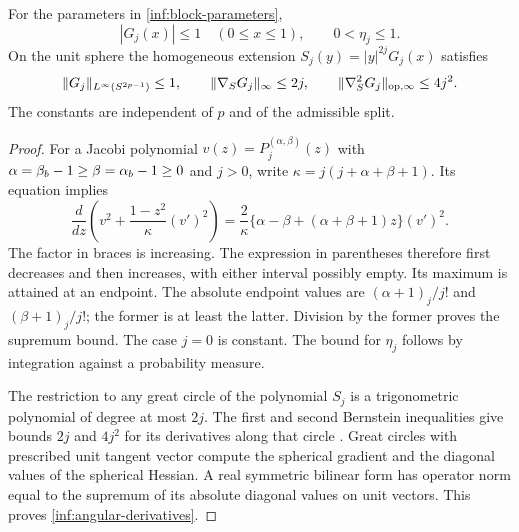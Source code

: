 \begin{lemma}\label{inf:angular-sup}
For the parameters in \eqref{inf:block-parameters},
\[
 |G_j(x)|\le1\quad(0\le x\le1),\qquad 0<\eta_j\le1.
\]
On the unit sphere the homogeneous extension
$S_j(y)=|y|^{2j}G_j(x)$ satisfies
\begin{equation}\label{inf:angular-derivatives}
 \lVert G_j\rVert_{L^\infty(S^{2p-1})}\le1,\qquad
 \lVert \nabla_S G_j\rVert_\infty\le2j,\qquad
 \lVert \nabla_S^2G_j\rVert_{\mathrm{op},\infty}\le4j^2.
\end{equation}
The constants are independent of $p$ and of the admissible split.
\end{lemma}
\begin{proof}
For a Jacobi polynomial $v(z)=P_j^{(\alpha,\beta)}(z)$ with
$\alpha=\beta_b-1\ge\beta=\alpha_b-1\ge0$ and $j>0$, write
$\kappa=j(j+\alpha+\beta+1)$. Its equation implies
\[
 \frac d{dz}\left(v^2+\frac{1-z^2}{\kappa}(v')^2\right)
 =\frac2\kappa\{\alpha-\beta+(\alpha+\beta+1)z\}(v')^2.
\]
The factor in braces is increasing. The expression in parentheses
therefore first decreases and then increases, with either interval
possibly empty. Its maximum is attained at an endpoint. The absolute
endpoint values are $(\alpha+1)_j/j!$ and $(\beta+1)_j/j!$; the former
is at least the latter. Division by the former proves the supremum
bound. The case $j=0$ is constant. The bound for $\eta_j$ follows by
integration against a probability measure.

The restriction to any great circle of the polynomial $S_j$ is a
trigonometric polynomial of degree at most $2j$. The first and second
Bernstein inequalities give bounds $2j$ and $4j^2$ for its derivatives
along that circle \cite[Vol.~II, Ch.~X, Theorem~3.13]{inf:zygmund}.
Great circles with prescribed unit tangent vector
compute the spherical gradient and the diagonal values of the
spherical Hessian. A real symmetric bilinear form has operator norm
equal to the supremum of its absolute diagonal values on unit vectors.
This proves \eqref{inf:angular-derivatives}.
\end{proof}

